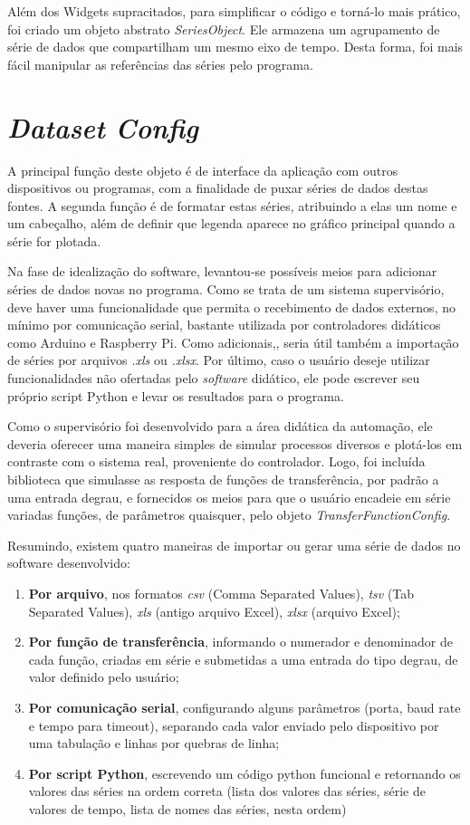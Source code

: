 Além dos Widgets supracitados, para simplificar o código e torná-lo mais prático, foi criado um objeto abstrato \emph{SeriesObject}. Ele armazena um agrupamento de série de dados que compartilham um mesmo eixo de tempo. Desta forma, foi mais fácil manipular as referências das séries pelo programa.

\section{\emph{Dataset Config}}

A principal função deste objeto é de interface da aplicação com outros dispositivos ou programas, com a finalidade de puxar séries de dados destas fontes. A segunda função é de formatar estas séries, atribuindo a elas um nome e um cabeçalho, além de definir que legenda aparece no gráfico principal quando a série for plotada.

Na fase de idealização do software, levantou-se possíveis meios para adicionar séries de dados novas no programa. Como se trata de um sistema supervisório, deve haver uma funcionalidade que permita o recebimento de dados externos, no mínimo por comunicação serial, bastante utilizada por controladores didáticos como Arduino e Raspberry Pi. Como adicionais,, seria útil também a importação de séries por arquivos \emph{.xls} ou \emph{.xlsx}. Por último, caso o usuário deseje utilizar funcionalidades não ofertadas pelo \textit{software} didático, ele pode escrever seu próprio script Python e levar os resultados para o programa.

Como o supervisório foi desenvolvido para a área didática da automação, ele deveria oferecer uma maneira simples de simular processos diversos e plotá-los em contraste com o sistema real, proveniente do controlador. Logo, foi incluída biblioteca que simulasse as resposta de funções de transferência, por padrão a uma entrada degrau, e fornecidos os meios para que o usuário encadeie em série variadas funções, de parâmetros quaisquer, pelo objeto \emph{TransferFunctionConfig}.

Resumindo, existem quatro maneiras de importar ou gerar uma série de dados no software desenvolvido:

\begin{enumerate}
	\item \textbf{Por arquivo}, nos formatos \emph{csv} (Comma Separated Values), \emph{tsv} (Tab Separated Values), \emph{xls} (antigo arquivo Excel), \emph{xlsx} (arquivo Excel);
	\item \textbf{Por função de transferência}, informando o numerador e denominador de cada função, criadas em série e submetidas a uma entrada do tipo degrau, de valor definido pelo usuário;
	\item \textbf{Por comunicação serial}, configurando alguns parâmetros (porta, baud rate e tempo para timeout), separando cada valor enviado pelo dispositivo por uma tabulação e linhas por quebras de linha;
	\item \textbf{Por script Python}, escrevendo um código python funcional e retornando os valores das séries na ordem correta (lista dos valores das séries, série de valores de tempo, lista de nomes das séries, nesta ordem)
\end{enumerate}

